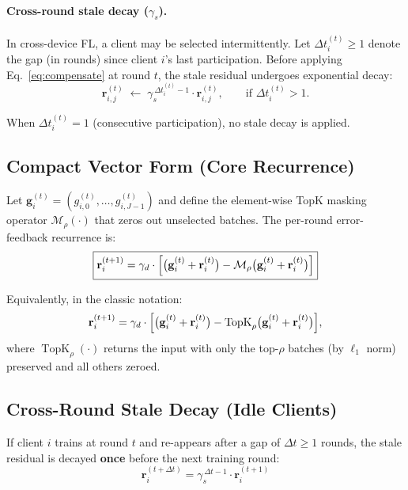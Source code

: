 \documentclass{article}
\begin{document}
\paragraph{Cross-round stale decay ($\gamma_s$).}
In cross-device FL, a client may be selected intermittently. Let $\Delta t_i^{(t)} \ge 1$ denote the gap (in rounds) since client $i$'s last participation. Before applying Eq.~\eqref{eq:compensate} at round $t$, the stale residual undergoes exponential decay:
%
\begin{equation}
\boxed{
\mathbf{r}_{i,j}^{(t)} \;\gets\; \gamma_s^{\,\Delta t_i^{(t)} - 1} \cdot \mathbf{r}_{i,j}^{(t)},
\qquad \text{if } \Delta t_i^{(t)} > 1.
}
\label{eq:stale-decay}
\end{equation}

When $\Delta t_i^{(t)} = 1$ (consecutive participation), no stale decay is applied.

\subsection*{Compact Vector Form (Core Recurrence)}

Let $\mathbf{g}_i^{(t)} = (g_{i,0}^{(t)}, \dots, g_{i,J-1}^{(t)})$ and define the element-wise TopK masking operator $\mathcal{M}_\rho(\cdot)$ that zeros out unselected batches. The per-round error-feedback recurrence is:
%
\begin{equation}
\boxed{
\mathbf{r}_i^{(t+1)} = \gamma_d \cdot \Bigl[ \bigl(\mathbf{g}_i^{(t)} + \mathbf{r}_i^{(t)}\bigr) - \mathcal{M}_\rho\bigl(\mathbf{g}_i^{(t)} + \mathbf{r}_i^{(t)}\bigr) \Bigr]
}
\label{eq:compact}
\end{equation}

Equivalently, in the classic notation:
%
\begin{equation}
\mathbf{r}_i^{(t+1)} = \gamma_d \cdot \Bigl[ \bigl(\mathbf{g}_i^{(t)} + \mathbf{r}_i^{(t)}\bigr) - \operatorname{TopK}_\rho\bigl(\mathbf{g}_i^{(t)} + \mathbf{r}_i^{(t)}\bigr) \Bigr],
\end{equation}
where $\operatorname{TopK}_\rho(\cdot)$ returns the input with only the top-$\rho$ batches (by $\ell_1$ norm) preserved and all others zeroed.

\subsection*{Cross-Round Stale Decay (Idle Clients)}

If client $i$ trains at round $t$ and re-appears after a gap of $\Delta t \ge 1$ rounds, the stale residual is decayed \textbf{once} before the next training round:
%
\begin{equation}
\boxed{
\mathbf{r}_i^{(t+\Delta t)} = \gamma_s^{\,\Delta t - 1} \cdot \mathbf{r}_i^{(t+1)}
}
\label{eq:stale-compact}
\end{equation}
\end{document}
